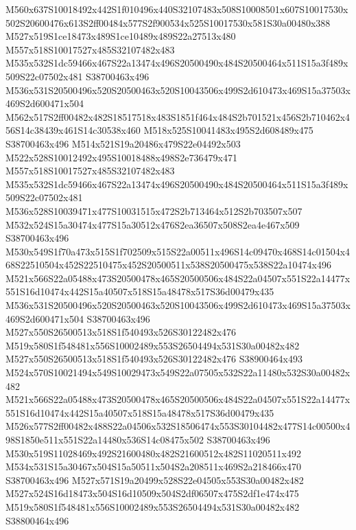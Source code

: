 \documentclass{article}
\begin{document}
\begin{multicols}{2}
M560x637S10018492x442S1f010496x440S32107483x508S10008501x607S10017530x502S20600476x613S2ff00484x577S2f900534x525S10017530x581S30a00480x388 M527x519S1ce18473x489S1ce10489x489S22a27513x480 M557x518S10017527x485S32107482x483 M535x532S1dc59466x467S22a13474x496S20500490x484S20500464x511S15a3f489x509S22c07502x481 S38700463x496 M536x531S20500496x520S20500463x520S10043506x499S2d610473x469S15a37503x469S2d600471x504 M562x517S2ff00482x482S18517518x483S1851f464x484S2b701521x456S2b710462x456S14c38439x461S14c30538x460 M518x525S10041483x495S2d608489x475 S38700463x496 M514x521S19a20486x479S22e04492x503 M522x528S10012492x495S10018488x498S2e736479x471 M557x518S10017527x485S32107482x483 M535x532S1dc59466x467S22a13474x496S20500490x484S20500464x511S15a3f489x509S22c07502x481 M536x528S10039471x477S10031515x472S2b713464x512S2b703507x507 M532x524S15a30474x477S15a30512x476S2ea36507x508S2ea4e467x509 S38700463x496 M530x549S1f70a473x515S1f702509x515S22a00511x496S14c09470x468S14c01504x468S22510504x452S22510475x452S20500511x538S20500475x538S22a10474x496 M521x566S22a05488x473S20500478x465S20500506x484S22a04507x551S22a14477x551S16d10474x442S15a40507x518S15a48478x517S36d00479x435 M536x531S20500496x520S20500463x520S10043506x499S2d610473x469S15a37503x469S2d600471x504 S38700463x496 M527x550S26500513x518S1f540493x526S30122482x476 M519x580S1f548481x556S10002489x553S26504494x531S30a00482x482 M527x550S26500513x518S1f540493x526S30122482x476 S38900464x493 M524x570S10021494x549S10029473x549S22a07505x532S22a11480x532S30a00482x482 M521x566S22a05488x473S20500478x465S20500506x484S22a04507x551S22a14477x551S16d10474x442S15a40507x518S15a48478x517S36d00479x435 M526x577S2ff00482x488S22a04506x532S18506474x553S30104482x477S14c00500x498S1850e511x551S22a14480x536S14c08475x502 S38700463x496 M530x519S11028469x492S21600480x482S21600512x482S11020511x492 M534x531S15a30467x504S15a50511x504S2a208511x469S2a218466x470 S38700463x496 M527x571S19a20499x528S22e04505x553S30a00482x482 M527x524S16d18473x504S16d10509x504S2df06507x475S2df1e474x475 M519x580S1f548481x556S10002489x553S26504494x531S30a00482x482 S38800464x496


\end{multicols}
\end{document}
